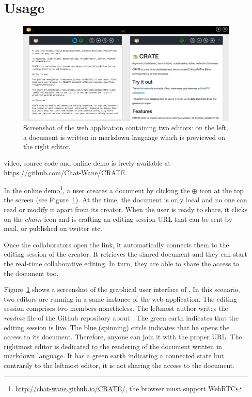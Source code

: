 
\section{Usage}
\label{sec:usage}

\begin{figure}
  \includegraphics[width=\textwidth]{./img/screenshot.png}
  \caption{\label{img:screenshot} Screenshot of the web application containing
    two editors: on the left, a document is written in markdown language which
    is previewed on the right editor.}
\end{figure}

\CRATE video, source code and online demo is freely available at
\url{https://github.com/Chat-Wane/CRATE}.


In the online demo\footnote{\url{http://chat-wane.github.io/CRATE/}, the browser
  must support WebRTC}, a user creates a document by clicking the $\oplus$ icon
at the top the screen (see Figure~\ref{img:screenshot}). At the time, the
document is only local and no one can read or modify it apart from its
creator. When the user is ready to share, it clicks on the $chain$ icon and
\CRATE is crafting an editing session URL that can be sent by mail, or published
on twitter etc.

Once the collaborators open the link, it automatically connects them
to the editing session of the creator. It retrieves the shared
document and they can start the real-time collaborative editing. In
turn, they are able to share the access to the document too. 

Figure~\ref{img:screenshot} shows a screenshot of the graphical user interface
of \CRATE. In this scenario, two editors are running in a same instance of the
web application. The editing session comprises two members nonetheless. The
leftmost author writes the \emph{readme} file of the Github repository about
\CRATE. The green earth indicates that the editing session is live. The blue
(spinning) circle indicates that he opens the access to its document. Therefore,
anyone can join it with the proper URL. The rightmost editor is dedicated to the
rendering of the document written in markdown language. It has a green earth
indicating a connected state but contrarily to the leftmost editor, it is not
sharing the access to the document.

